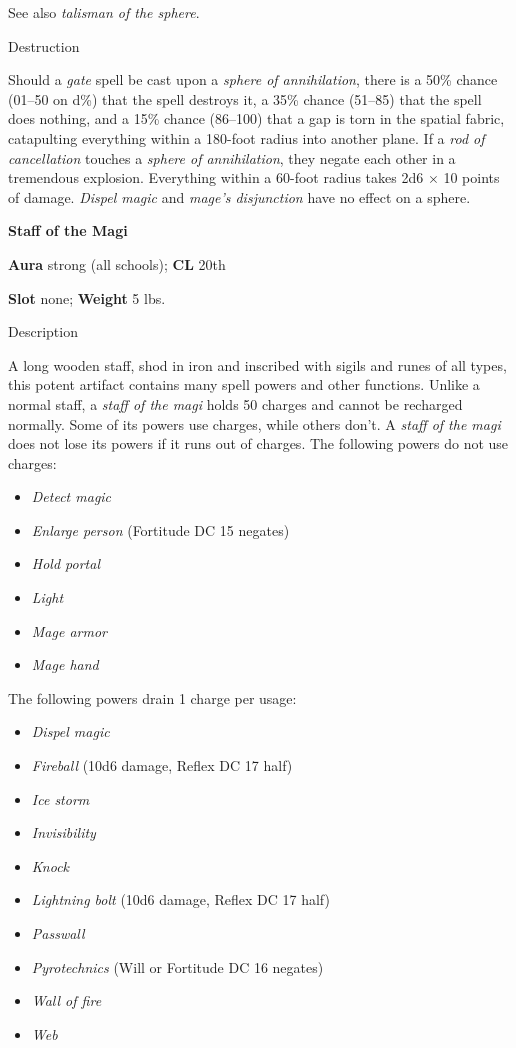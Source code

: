 See also \textit{talisman of the sphere}. 
				
Destruction
				
Should a \textit{gate} spell be cast upon a \textit{sphere of annihilation}, there is a 50\% chance (01--50 on d\%) that the spell destroys it, a 35\% chance (51--85) that the spell does nothing, and a 15\% chance (86--100) that a gap is torn in the spatial fabric, catapulting everything within a 180-foot radius into another plane. If a \textit{rod of cancellation} touches a \textit{sphere of annihilation}, they negate each other in a tremendous explosion. Everything within a 60-foot radius takes 2d6 \mbox{$\times$} 10 points of damage. \textit{Dispel magic} and \textit{mage's disjunction} have no effect on a sphere.
				
\textbf{Staff of the Magi}
				
\textbf{Aura} strong (all schools); \textbf{CL} 20th
				
\textbf{Slot} none; \textbf{Weight} 5 lbs.
				
Description
				
A long wooden staff, shod in iron and inscribed with sigils and runes of all types, this potent artifact contains many spell powers and other functions. Unlike a normal staff, a \textit{staff of the magi} holds 50 charges and cannot be recharged normally. Some of its powers use charges, while others don't. A \textit{staff of the magi} does not lose its powers if it runs out of charges. The following powers do not use charges:
				\begin{itemize}\item  \textit{Detect magic}
				\item  \textit{Enlarge person} (Fortitude DC 15 negates)
				\item  \textit{Hold portal}
				\item  \textit{Light}
				\item  \textit{Mage armor}
				\item  \textit{Mage hand}
\end{itemize}
				
The following powers drain 1 charge per usage:
				\begin{itemize}\item  \textit{Dispel magic}
				\item  \textit{Fireball} (10d6 damage, Reflex DC 17 half)
				\item  \textit{Ice storm}
				\item  \textit{Invisibility}
				\item  \textit{Knock}
				\item  \textit{Lightning bolt} (10d6 damage, Reflex DC 17 half)
				\item  \textit{Passwall}
				\item  \textit{Pyrotechnics} (Will or Fortitude DC 16 negates)
				\item  \textit{Wall of fire}
				\item  \textit{Web}
\end{itemize}
				
